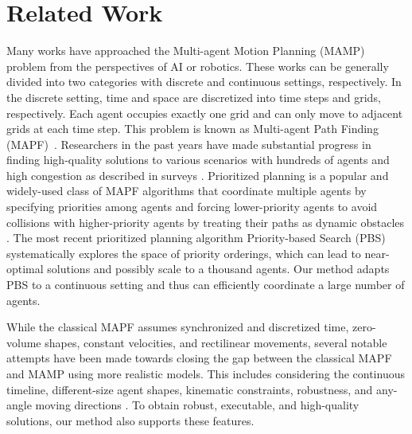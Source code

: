 \documentclass[letterpaper]{article} %
\theoremstyle{definition}
\begin{document}
\section{Related Work}\label{section:related}

Many works have approached the Multi-agent Motion Planning (MAMP) problem from the perspectives of AI or robotics. These works can be generally divided into two categories with discrete and continuous settings, respectively. In the discrete setting, time and space are discretized into time steps and grids, respectively. Each agent occupies exactly one grid and can only move to adjacent grids at each time step. This problem is known as Multi-agent Path Finding (MAPF)~\cite{SternSoCS19}.
Researchers in the past years have made substantial progress in finding high-quality solutions to various scenarios with hundreds of agents and high congestion
as described in surveys \cite{MaWOMAPF16,felner2017search}. 
Prioritized planning is a popular and widely-used class of MAPF algorithms that coordinate multiple agents by specifying priorities among agents and forcing lower-priority agents to avoid collisions with higher-priority agents by treating their paths as dynamic obstacles \cite{velagapudi2010decentralized,vcap2015complete}. The most recent prioritized planning algorithm Priority-based Search (PBS) \cite{ma2019searching} systematically explores the space of priority orderings, which can lead to near-optimal solutions and possibly scale to a thousand agents. Our method adapts PBS to a continuous setting and thus can efficiently coordinate a large number of agents.

While the classical MAPF assumes synchronized and discretized time, zero-volume shapes, constant velocities, and rectilinear movements, several notable attempts have been made towards closing the gap between the classical MAPF and MAMP using more realistic models. This includes considering the continuous timeline, different-size agent shapes, kinematic constraints, robustness, and any-angle moving directions \cite{walker2018extended,li2019multi,cohen2019optimal,AndreychukYAS19,MaAAAI17,AtzmonAI20,YakovlevA17}. To obtain robust, executable, and high-quality solutions, our method also supports these features.
\end{document}
